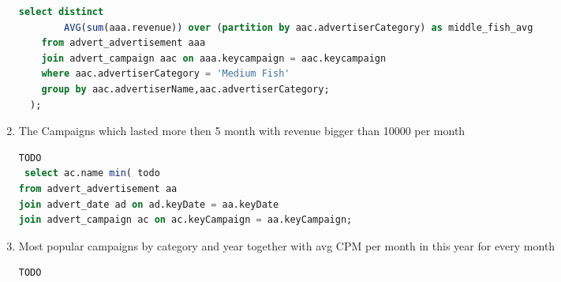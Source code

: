 \begin{enumerate}
\begin{lstlisting}[language=sql]
    select distinct
        AVG(sum(aaa.revenue)) over (partition by aac.advertiserCategory) as middle_fish_avg
    from advert_advertisement aaa 
    join advert_campaign aac on aaa.keycampaign = aac.keycampaign
    where aac.advertiserCategory = 'Medium Fish'   
    group by aac.advertiserName,aac.advertiserCategory;
  );      
  \end{lstlisting}
\item    The Campaigns which lasted more then 5 month with revenue bigger than 10000 per month
  \begin{lstlisting}[language=sql] 
 TODO
 select ac.name min( todo
from advert_advertisement aa
join advert_date ad on ad.keyDate = aa.keyDate
join advert_campaign ac on ac.keyCampaign = aa.keyCampaign;
  \end{lstlisting}
\item    Most popular campaigns by category and year together with avg CPM per month in this year for every month
  \begin{lstlisting}[language=sql] 
  TODO
  \end{lstlisting}
\end{enumerate}

